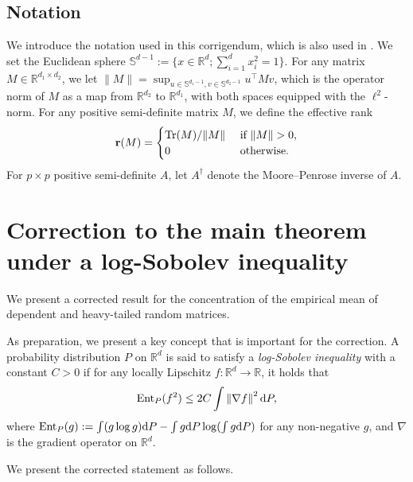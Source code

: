 \documentclass[11pt,a4paper]{article}
\theoremstyle{remark}
\theoremstyle{definition}
\newcommand{\bu}{u}
\newcommand{\bv}{v}
\newcommand{\bx}{x}
\newcommand{\bfA}{A}
\newcommand{\bfM}{M}
\newcommand{\bbS}{\mathbb{S}}
\newcommand{\R}{\mathbb{R}}
\newcommand{\tr}{\textnormal{Tr}}
\newcommand{\diff}{\textnormal{d}}
\newcommand{\Ent}{\textnormal{Ent}}
\newcommand{\er}{\mathbf{r}}
\theoremstyle{definition}
\begin{document}
\begin{bibunit}[apalike]
\subsection{Notation}
We introduce the notation used in this corrigendum, which is also used in \citet{nakakita2024dimension}.
We set the Euclidean sphere $\bbS^{d-1}:=\{\bx\in\R^{d};\sum_{i=1}^{d}\bx_{i}^{2}=1\}$.
For any matrix $\bfM\in\R^{d_{1}\times d_{2}}$, we let $\|\bfM\|=\sup_{\bu\in\bbS^{d_{1}-1},\bv\in\bbS^{d_{2}-1}}\bu^{\top}\bfM\bv$, which is the operator norm of $\bfM$ as a map from $\R^{d_{2}}$ to $\R^{d_{1}}$, with both spaces equipped with the $\ell^{2}$-norm.
For any positive semi-definite matrix $\bfM$, we define the effective rank 
\begin{equation*}
    \er(\bfM)=\begin{cases}
        \tr(\bfM)/\|\bfM\| & \text{ if }\|\bfM\|>0,\\
        0 & \text{ otherwise.}
    \end{cases}
\end{equation*}
For $p\times p$ positive semi-definite $\bfA$, let $\bfA^{\dagger}$ denote the Moore--Penrose inverse of $\bfA$.

\section{Correction to the main theorem under a log-Sobolev inequality}


We present a corrected result for the concentration of the empirical mean of dependent and heavy-tailed random matrices.


As preparation, we present a key concept that is important for the correction.
A probability distribution $P$ on $\R^{d}$ is said to satisfy a \textit{log-Sobolev inequality} with a constant $C>0$ if for any locally Lipschitz $f:\R^{d}\to\R$, it holds that
\begin{equation*}
    \Ent_{P}(f^{2})\le 2C\int \left\|\nabla f\right\|^{2}\diff P,
\end{equation*}
where $\Ent_{P}(g):=\int (g\log g)\diff P-\int g\diff P\log(\int g\diff P)$ for any non-negative $g$, and $\nabla$ is the gradient operator on $\R^{d}$.

We present the corrected statement as follows.


\end{bibunit}
\end{document}
